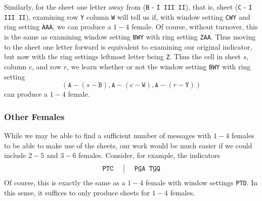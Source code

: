 \noindent Similarly, for the sheet one letter away from (\texttt{B} - \texttt{I III II}), that is, sheet (\texttt{C} - \texttt{I III II}), examining row \texttt{Y} column \texttt{W} will tell us if, with window setting \texttt{CWY} and ring setting \texttt{AAA}, we can produce a $1-4$ female. Of course, without turnover, this is the same as examining window setting \texttt{BWY} with ring setting \texttt{ZAA}. Thus moving to the sheet one letter forward is equivalent to examining our original indicator, but now with the ring settings leftmost letter being \texttt{Z}. Thus the cell in sheet $s$, column $c$, and row $r$, we learn whether or not the window setting \texttt{BWY} with ring setting
\[
	(\texttt{A} - (s - \texttt{B}), \texttt{A} - (c -\texttt{W}), \texttt{A} - (r -\texttt{Y}))
\]
can produce a $1-4$ female.

\subsubsection{Other Females} While we may be able to find a sufficient number of messages with $1-4$ females to be able to make use of the sheets, our work would be much easier if we could include $2-5$ and $3-6$ females. Consider, for example, the indicators
\[
	\setlength{\arraycolsep}{15pt}
	\begin{array}{c | c}
		\texttt{PTC} & \texttt{P}{\uline{\texttt{G}}}\texttt{A T}{\uline{\texttt{G}}}\texttt{Q}
	\end{array}
\]
Of course, this is exactly the same as a $1-4$ female with window settings \texttt{PTD}. In this sense, it suffices to only produce sheets for $1-4$ females.
